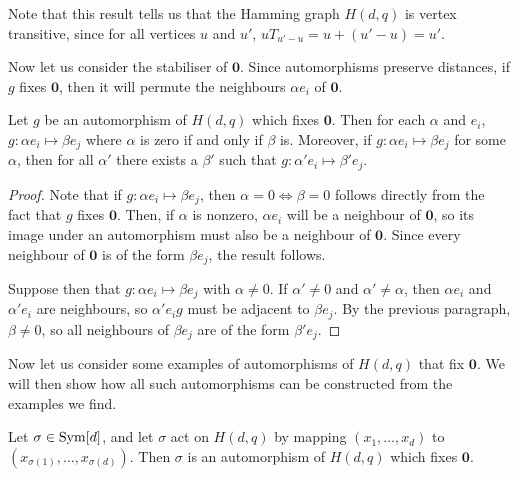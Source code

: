 \documentclass{report}
\newcommand{\vzero}{\mathbf{0}}
\begin{document}
    Note that this result tells us that the Hamming graph $H(d, q)$ is vertex
    transitive, since for all vertices $u$ and $u'$, $u T_{u' - u} = u + (u' -
    u) = u'$.

    Now let us consider the stabiliser of $\vzero$.  Since automorphisms
    preserve distances, if $g$ fixes $\vzero$, then it will permute the
    neighbours $\alpha e_i$ of $\vzero$.

    \begin{lem}\label{lem:hamming-automorphisms-preserve-component}
      Let $g$ be an automorphism  of $H(d, q)$ which fixes $\vzero$.  Then for
      each $\alpha$ and $e_i$, $g: \alpha e_i \mapsto \beta e_j$ where $\alpha$
      is zero if and only if $\beta$ is.
      Moreover, if $g: \alpha e_i \mapsto \beta e_j$ for some $\alpha$, then for
      all $\alpha'$ there exists a $\beta'$ such that $g: \alpha' e_i \mapsto
      \beta' e_j$.
    \end{lem}

    \begin{proof}
      Note that if $g: \alpha e_i \mapsto \beta e_j$, then $\alpha = 0 \iff \beta
      = 0$ follows directly from the fact that $g$ fixes $\vzero$.  Then, if
      $\alpha$ is nonzero, $\alpha e_i$ will be a neighbour of $\vzero$, so its
      image under an automorphism must also be a neighbour of $\vzero$.  Since
      every neighbour of $\vzero$ is of the form $\beta e_j$, the result
      follows.

      Suppose then that $g: \alpha e_i \mapsto \beta e_j$ with $\alpha \neq 0$.
      If $\alpha' \neq 0$ and $\alpha' \neq \alpha$, then $\alpha e_i$ and
      $\alpha' e_i$ are neighbours, so $\alpha' e_i g$ must be adjacent to
      $\beta e_j$.  By the previous paragraph, $\beta \neq 0$, so all neighbours
      of $\beta e_j$ are of the form $\beta' e_j$.
    \end{proof}

    Now let us consider some examples of automorphisms of $H(d, q)$ that fix
    $\vzero$.  We will then show how all such automorphisms can be constructed
    from the examples we find.

    \begin{lem}\label{lem:hamming-component-permutation}
      Let $\sigma \in \operatorname{Sym} [d]$, and let $\sigma$ act on $H(d, q)$ by mapping
      $(x_1, \ldots, x_d)$ to $(x_{\sigma(1)}, \ldots, x_{\sigma(d)})$.  Then
      $\sigma$ is an automorphism of $H(d, q)$ which fixes $\vzero$.
    \end{lem}
\end{document}
